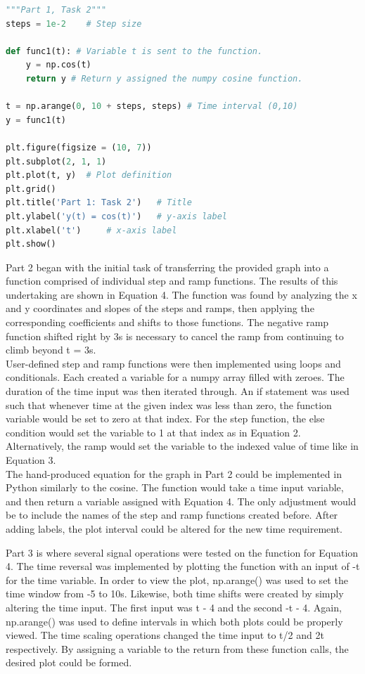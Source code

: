 \documentclass[12pt]{report}
\begin{document}
\begin{lstlisting}[language=Python]
"""Part 1, Task 2"""
steps = 1e-2    # Step size

def func1(t): # Variable t is sent to the function.
    y = np.cos(t)
    return y # Return y assigned the numpy cosine function.

t = np.arange(0, 10 + steps, steps) # Time interval (0,10)
y = func1(t)

plt.figure(figsize = (10, 7))
plt.subplot(2, 1, 1)
plt.plot(t, y)  # Plot definition
plt.grid()
plt.title('Part 1: Task 2')   # Title
plt.ylabel('y(t) = cos(t)')   # y-axis label
plt.xlabel('t')     # x-axis label
plt.show()
\end{lstlisting}

Part 2 began with the initial task of transferring the provided graph into a function comprised of individual step and ramp functions. The results of this undertaking are shown in Equation 4. The function was found by analyzing the x and y coordinates and slopes of the steps and ramps, then applying the corresponding coefficients and shifts to those functions. The negative ramp function shifted right by 3s is necessary to cancel the ramp from continuing to climb beyond t = 3s. \\

User-defined step and ramp functions were then implemented using loops and conditionals. Each created a variable for a numpy array filled with zeroes. The duration of the time input was then iterated through. An if statement was used such that whenever time at the given index was less than zero, the function variable would be set to zero at that index. For the step function, the else condition would set the variable to 1 at that index as in Equation 2. Alternatively, the ramp would set the variable to the indexed value of time like in Equation 3. \\

The hand-produced equation for the graph in Part 2 could be implemented in Python similarly to the cosine. The function would take a time input variable, and then return a variable assigned with Equation 4. The only adjustment would be to include the names of the step and ramp functions created before. After adding labels, the plot interval could be altered for the new time requirement. 

Part 3 is where several signal operations were tested on the function for Equation 4. The time reversal was implemented by plotting the function with an input of -t for the time variable. In order to view the plot, np.arange() was used to set the time window from -5 to 10s. Likewise, both time shifts were created by simply altering the time input. The first input was t - 4 and the second -t - 4. Again, np.arange() was used to define intervals in which both plots could be properly viewed. The time scaling operations changed the time input to t/2 and 2t respectively. By assigning a variable to the return from these function calls, the desired plot could be formed. \\
\end{document}
